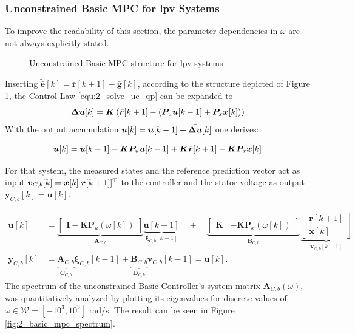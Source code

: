 \subsubsection{Unconstrained Basic MPC for \acrshort{lpv} Systems}
To improve the readability of this section, the parameter dependencies in $\omega$ are not always explicitly stated.
\begin{figure}
	\centering
	
	\caption{Unconstrained Basic MPC structure for \acrshort{lpv} systems}
	\label{fig:Basic_MPC_unconstrained}
\end{figure}
Inserting $\tilde{\bar{\bm e}}[k]=\bar{\bm r}[k+1]-\bm \bar{\bm{g}}[k]$, according to the structure depicted of Figure \ref{fig:Basic_MPC_unconstrained}, the Control Law \eqref{equ:2_solve_uc_qp} can be expanded to
\[
\Bar{\bm{\Delta u}}[k] = \bm{K} \left(\bar{\bm{r}}[k+1] - \left( \bm{P}_u \bm{u}[k-1] + \bm{P}_x {\bm{x}}[k]\right) \right) 
\]
With the output accumulation $\bm{u}[k] = \bm{u}[k-1] + \Bar{\bm{\Delta u}}[k]$ one derives:

\[
\bm{u}[k] =  \bm{u}[k-1] - \bm{K}\bm{P}_u \bm{u}[k-1] + \bm{K}  \bar{\bm{r}}[k+1] - \bm{K}\bm{P}_x {\bm{x}}[k]
\]

For that system, the measured states and the reference prediction vector act as input $\bm{v}_{C,b}[k] = {\bm{x}}[k]\;  \bar{\bm{r}}[k+1]]^{\mathrm{T}}$ to the controller and the stator voltage as output $\bm{y}_{C,b}[k] = \bm{u}[k]$. 

\begin{align}
	\bm{u}[k]
	&=
	\underbrace{
		\begin{bmatrix}
			\bm{I} -\bm{K}\bm{P}_u(\omega[k])
		\end{bmatrix}
	}_{\bm{A}_{C,b}}
	\underbrace{
	\bm{u}[k-1]}_{\bm{\xi}_{C,b}[k-1]}
	\quad+\quad
	\underbrace{
		\begin{bmatrix}
			\bm{K} & -\bm{K}\bm{P}_x(\omega[k])
		\end{bmatrix}
	}_{\bm{B}_{C,b}}
	\underbrace{
	\begin{bmatrix}
		\bar{\bm{r}}[k+1]\\
		\bm{x}[k]
	\end{bmatrix}}_{\bm{v}_{C,b}[k-1]}
	\\
	\bm{y}_{C,b}[k]
	&=
	\underbrace{
	\bm{A}_{C,b}}_{\bm{C}_{C,b}}
	\bm{\xi}_{C,b}[k-1]
	+
	\underbrace{ 
	\bm{B}_{C,b}}_{\bm{D}_{C,b}}
	\bm{v}_{C,b}[k-1]
	=
	\bm{u}[k].
	\label{equ:2_ss_basic_mpc}
\end{align}
The spectrum of the unconstrained Basic Controller's system matrix $\bm{A}_{C,b}(\omega)$, was quantitatively analyzed by plotting its eigenvalues for discrete values of $\omega \in \mathcal{W} = [-10^3, 10^3]$ rad/s.
The result can be seen in Figure \ref{fig:2_basic_mpc_spectrum}.

